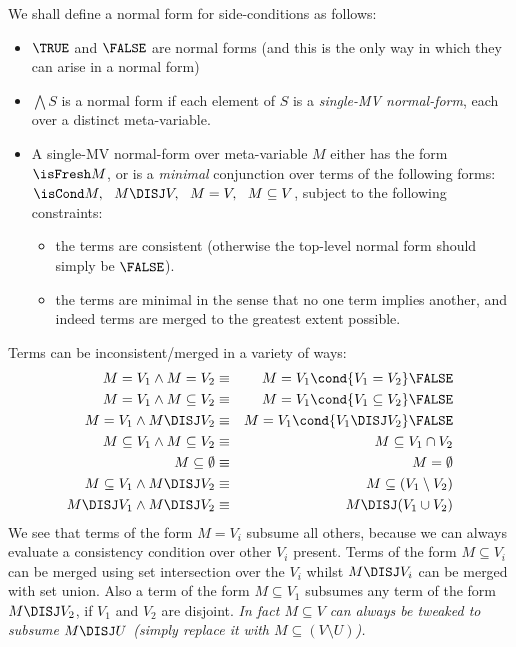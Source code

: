We shall define a normal form  for side-conditions as follows:
\begin{itemize}
  \item
    $\TRUE$ and $\FALSE$ are normal forms
    (and this is the only way in which they can arise in a normal form)
  \item
    $\bigwedge S$ is a normal form if each element of $S$
    is a \emph{single-MV normal-form}, each over a distinct meta-variable.
  \item
    A single-MV normal-form over meta-variable $M$
    either has the form $\isFresh M$,
    or is a \emph{minimal} conjunction over terms of the following forms:
     $\isCond M,~~M \DISJ V,~~M=V,~~M \subseteq V$,
     subject to the following constraints:
     \begin{itemize}
       \item
         the terms are consistent
         (otherwise the top-level normal form should simply be $\FALSE$).
       \item
         the terms are minimal in the sense that no one term implies another,
         and indeed terms are merged to the greatest extent possible.
     \end{itemize}
\end{itemize}
Terms can be inconsistent/merged in a variety of ways:
\begin{eqnarray*}
   M=V_1 \land M=V_2  &\equiv& M = V_1 \cond{V_1 = V_2} \FALSE
\\ M=V_1  \land M \subseteq V_2 &\equiv& M = V_1 \cond{V_1 \subseteq V_2} \FALSE
\\ M=V_1  \land M \DISJ V_2 &\equiv& M = V_1 \cond{V_1 \DISJ V_2} \FALSE
\\ M \subseteq V_1  \land M \subseteq V_2 &\equiv& M \subseteq V_1 \cap V_2
\\ M \subseteq \emptyset  &\equiv& M = \emptyset
\\ M \subseteq V_1  \land M \DISJ V_2 &\equiv& M \subseteq (V_1 \setminus V_2)
\\ M \DISJ V_1 \land M \DISJ V_2 &\equiv& M \DISJ (V_1 \cup V_2)
\end{eqnarray*}
We see that terms of the form $M = V_i$ subsume all others,
because we can always evaluate a consistency condition over
other $V_i$ present.
Terms of the form $M \subseteq V_i$ can be merged using set intersection
over the $V_i$ whilst $M \DISJ V_i$ can be merged with set union.
Also a term of the form $M \subseteq V_1$ subsumes
any term of the form $M \DISJ V_2$, if $V_1$ and $V_2$ are disjoint.
\emph{In fact $M \subseteq V$ can always be tweaked to subsume $M \DISJ U$
(simply replace it with $M \subseteq (V \setminus U)$).
}
